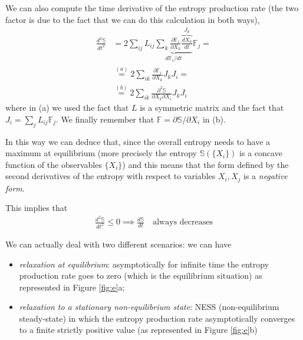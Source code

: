 \documentclass[\main/main.tex]{subfiles}
\begin{document}
We can also compute the time derivative of the entropy production rate (the two factor is due to the fact that we can do this calculation in both ways),
\begin{align}
\frac{d^{2} \mathbb{S}}{d t^{2}} &=2 \sum_{i j} L_{i j} \underbrace{\sum_{k} \frac{\partial \mathbb{F}_{i}}{\partial X_{k}} \overbrace{\frac{d X_{k}}{d t}}^{J_k} }_{d\mathbb{F}_i/dt} \mathbb{F}_{j} = \\
&\overset{(a)}{= }2 \sum_{i k} \frac{\partial \mathbb{F}_{i}}{\partial X_{k}} J_{k} J_{i} =\\
&\overset{(b)}{=}2 \sum_{i k} \frac{\partial^{2} \mathbb{S}}{\partial X_{k} \partial X_{i}} J_{k} J_{i}
\end{align}
where in (a) we used the fact that $L$ is a symmetric matrix and the fact that $J_i=\sum_jL_{ij}\mathbb{F}_j$. We finally remember that $\mathbb{F}=\partial \mathbb{S}/\partial X_i$ in (b).

In this way we can deduce that, since the overall entropy needs to have a maximum at equilibrium (more precisely the entropy $\mathbb{S}(\{X_i\})$ is a concave function of the observables $\{X_i\}$) and this means that the form defined by the second derivatives of the entropy with respect to variables $X_{i},X_{j}$ is a \textit{negative form}.

This implies that 
\begin{align}
    \frac{d^2\mathbb{S}}{dt^2}\leq 0 \implies \frac{d\mathbb{S}}{dt}\quad \text{always decreases}
\end{align}

We can actually deal with two different scenarios: we can have
\begin{itemize}
    \item \textit{relaxation at equilibrium}: asymptotically for infinite time the entropy production rate goes to zero (which is the equilibrium situation) as represented in Figure \ref{fig:e}a;
    \item \textit{relaxation to a stationary non-equilibrium state}: NESS (non-equilibrium steady-state) in which the entropy production rate asymptotically converges to a finite strictly positive value (as represented in Figure \ref{fig:e}b)
\end{itemize}
\end{document}
